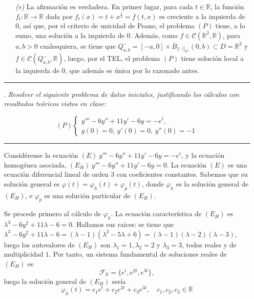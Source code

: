 \documentclass[11pt]{report}
\newcommand{\R}{\mathbb R}
\begin{document}
\begin{itemize}
    \item[\textit{(e)}] La afirmación es verdadera. En primer lugar, para cada $t \in \R$, la función $f_t \colon \R \to \R$ dada por $f_t(x)=t+x^{\frac{1}{3}}=f(t,x)$ es creciente a la izquierda de $0$, así que, por el criterio de unicidad de Peano, el problema $(P)$ tiene, a lo sumo, una solución a la izquierda de $0$. Además, como $f\in \mathcal{C}(\R^2,\R)$, para $a,b>0$ cualesquiera, se tiene que $Q_{a,b}^-=[-a,0]\times \overline{B}_{||\cdot||_{\R^n}}(0,b) \subset D=\R^2$ y $f \in \mathcal{C}(Q_{a,b}^-,\R)$, luego, por el TEL, el problema $(P)$ tiene solución local a la izquierda de 0, que además es única por lo razonado antes.
\end{itemize}

\vspace{2mm}

\hrule

\vspace{4mm}

. \textit{Resolver el siguiente problema de datos iniciales, justificando los cálculos con resultados teóricos vistos en clase:}

\[(P) \begin{cases}
    y'''-6y''+11y'-6y=-e^t,\\
    y(0)=0,\ y'(0)=0,\ y''(0)=-1
\end{cases}\]

\vspace{2mm}

\hrule

\vspace{4mm}

Considérense la ecuación $(E) \ y'''-6y''+11y'-6y=-e^t$, y la ecuación homogénea asociada, $(E_H) \ y'''-6y''+11y'-6y=0$. La ecuación $(E)$ es una ecuación diferencial lineal de orden $3$ con coeficientes constantes. Sabemos que su solución general es $\varphi(t)=\varphi_h(t)+\varphi_p(t)$, donde $\varphi_h$ es la solución general de $(E_H)$, e $\varphi_p$ es una solución particular de $(E_H)$.

\vspace{2mm}

Se procede primero al cálculo de $\varphi_h$. La ecuación característica de $(E_H)$ es $\lambda^3-6y^2+11\lambda-6=0$. Hallamos sus raíces: se tiene que $\lambda^3-6y^2+11\lambda-6=(\lambda-1)(\lambda^2-5\lambda+6)=(\lambda-1)(\lambda-2)(\lambda-3)$, luego los autovalores de $(E_H)$ son $\lambda_1=1,\lambda_2=2$ y $\lambda_3=3$, todos reales y de multiplicidad $1$. Por tanto, un sistema fundamental de soluciones reales de $(E_H)$ es
\[\mathcal{F_\R}=\{e^t,e^{2t},e^{3t}\},\]
luego la solución general de $(E_H)$ sería
\[\varphi_h(t)=c_1e^t+c_2e^{2t}+c_3e^{3t},\quad c_1,c_2,c_3 \in \R\]
\end{document}
